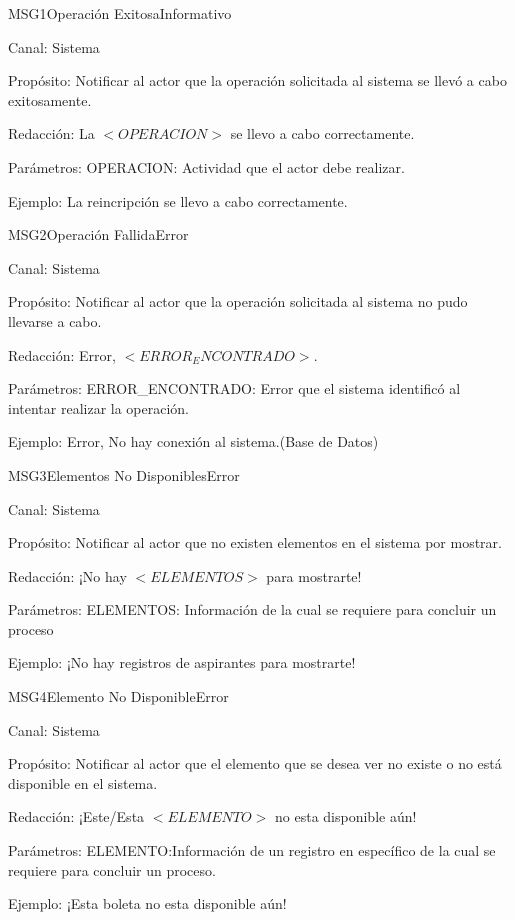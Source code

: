 \begin{mensaje}{MSG1}{Operación Exitosa}{Informativo }
	\item[Canal:] Sistema
	\item[Propósito:] Notificar al actor que la operación solicitada al sistema se llevó a cabo exitosamente.
	\item[Redacción:] La $<OPERACION>$ se llevo a cabo correctamente.
	\item[Parámetros:] OPERACION: Actividad que el actor debe realizar.
	\item[Ejemplo:] La reincripción se llevo a cabo correctamente.
\end{mensaje}

\begin{mensaje}{MSG2}{Operación Fallida}{Error}
	\item[Canal:] Sistema
	\item[Propósito:] Notificar al actor que la operación solicitada al sistema no pudo llevarse a cabo.
	\item[Redacción:] Error, $<ERROR_ENCONTRADO>$.
	\item[Parámetros:] ERROR\_ENCONTRADO: Error que el sistema identificó al intentar realizar la operación.
	\item[Ejemplo:] Error, No hay conexión al sistema.(Base de Datos)
\end{mensaje}


\begin{mensaje}{MSG3}{Elementos No Disponibles}{Error}
	\item[Canal:] Sistema
	\item[Propósito:] Notificar al actor que no existen elementos en el sistema por mostrar.
	\item[Redacción:] ¡No hay $<ELEMENTOS>$ para mostrarte!
	\item[Parámetros:] ELEMENTOS: Información de la cual se requiere para concluir un proceso
	\item[Ejemplo:] ¡No hay registros de aspirantes para mostrarte!
	
\end{mensaje}

\begin{mensaje}{MSG4}{Elemento No Disponible}{Error}
	\item[Canal:] Sistema
	\item[Propósito:] Notificar al actor que el elemento que se desea ver no existe o no está disponible en el sistema.
	\item[Redacción:] ¡Este/Esta $<ELEMENTO>$ no esta disponible aún!
	\item[Parámetros:] ELEMENTO:Información de un registro en específico de la cual se requiere para concluir un proceso.
	\item[Ejemplo:] ¡Esta boleta no esta disponible aún!
	
\end{mensaje}

